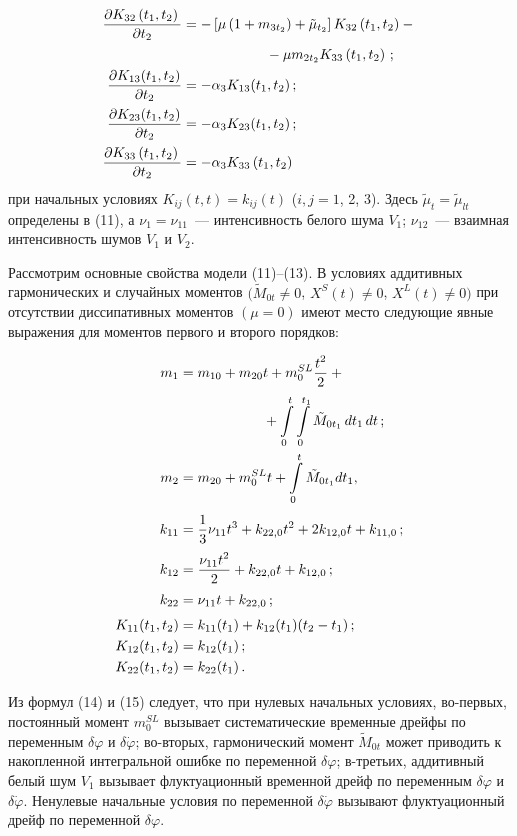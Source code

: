 \begin{multicols}{2}
\begin{align}
 \displaystyle\frac{\displaystyle \partial K_{32} \left(t_1, t_2\right)\mathstrut}{\displaystyle  \partial t_2\mathstrut} &= -\left[\mu\left(1+m_{3t_2} \right)+\tilde\mu_{t_2}\right] K_{32} \left(t_1, t_2\right) -{} \notag\\
 &\hspace*{60pt}{}-\mu m_{2t_2} K_{33} \left(t_1, t_2\right)\,;\notag\\
 \displaystyle\frac{\displaystyle \partial K_{13} (t_1, t_2)\mathstrut}{\displaystyle  \partial t_2\mathstrut} &=-\alpha_3 K_{13}(t_1, t_2)\,;\notag\\
 \displaystyle\frac{\displaystyle \partial K_{23} (t_1, t_2)\mathstrut}{\displaystyle  \partial t_2\mathstrut} &=-\alpha_3 K_{23} (t_1, t_2)\,;\notag\\
 \displaystyle\frac{\displaystyle \partial K_{33} \left(t_1, t_2\right)\mathstrut}{\displaystyle \partial t_2\mathstrut} &=-\alpha_3 K_{33} \left(t_1, t_2\right)\notag
 \end{align}
при начальных условиях $K_{ij}(t,t) = k_{ij}(t)$ ($i,j=1$, 2, 3).
Здесь $\tilde \mu_t =\tilde\mu_{lt}$ определены в (11), а $\nu_1 =
\nu_{11}$~--- интенсивность белого шума $V_1$; $\nu_{12}$~---
взаимная интенсивность шумов $V_1$ и $V_2$.

Рассмотрим основные свойства модели (11)--(13).
В условиях аддитивных гармонических и случайных моментов $(\tilde
M_{0t} \ne 0$, $ X^S (t)\ne 0$, $X^L (t)\ne 0)$ при отсутствии
диссипативных моментов $(\mu=0)$ имеют место следующие явные
выражения для моментов первого и второго порядков:

\noindent
 \begin{align}
 m_1 &= m_{10} + m_{20} t +m_0^{SL} \fr{t^2}{2} +{}\notag\\
&\hspace*{60pt}{}+ \iii_0^t\iii_0^{t_1} \tilde M_{0t_1}\,dt_1\,dt\,;\label{e22}\\
 m_2 &= m_{20} +m_0^{SL} t+\iii_0^t \tilde M_{0t_1}dt_1,\notag\\[3pt]
 k_{11} &=\fr{1}{3} \nu_{11} t^3 + k_{22,0} t^2 + 2 k_{12,0} t + k_{11, 0}\,;\notag\\
 k_{12} &= \fr{\nu_{11} t^2}{2}+ k_{22,0}t + k_{12,0}\,;\label{e23}\\
 k_{22} &= \nu_{11} t + k_{22,0}\,;\notag\\[3pt]
  K_{11}(t_1, t_2) &= k_{11} (t_1) + k_{12}(t_1) (t_2-t_1)\,;\notag\\
 K_{12}(t_1, t_2) &= k_{12} (t_1) \,; \notag\\
 K_{22} (t_1, t_2) &= k_{22} (t_1)\,.\notag %
 \end{align}

Из формул (14) и (15) следует, что при нулевых начальных условиях,
во-первых, постоянный момент $m_0^{SL}$ вызывает систематические
временные дрейфы по переменным $\delta\varphi$ и $\delta\dot\varphi$;
во-вторых, гармонический момент $\tilde M_{0t}$ может приводить к
накопленной интегральной ошибке по переменной $\delta\varphi$;
в-третьих, аддитивный белый шум $V_1$ вызывает флуктуационный временной
дрейф по переменным $\delta\varphi$ и $\delta\dot\varphi$. Ненулевые
начальные условия по переменной $\delta\dot\varphi$ вызывают флуктуационный
дрейф по переменной $\delta\varphi$.


\end{multicols}
